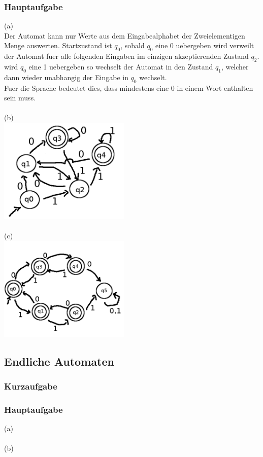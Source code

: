\documentclass{article}
\begin{document}
\subsubsection{Hauptaufgabe}
(a)\\
Der Automat kann nur Werte aus dem Eingabealphabet der Zweielementigen
Menge auswerten. Startzustand ist $q_0$, sobald $q_0$ eine 0 uebergeben
wird verweilt der Automat fuer alle folgenden Eingaben im einzigen 
akzeptierenden Zustand $q_2$. wird $q_0$ eine 1 uebergeben so wechselt 
der Automat in den Zustand $q_1$, welcher dann wieder unabhangig der 
Eingabe in $q_0$ wechselt.\\
Fuer die Sprache bedeutet dies, dass mindestens eine 0 in einem Wort enthalten
sein muss.\\
\\
(b)\\
\includegraphics[height=5cm]{./UB1/2b.png}\\
\\
(c)\\
\includegraphics[height=5cm]{./UB1/2c.png}\\

\newpage
\subsection{Endliche Automaten}
\subsubsection{Kurzaufgabe}
\subsubsection{Hauptaufgabe}
(a)\\
\\
(b)\\
\end{document}
